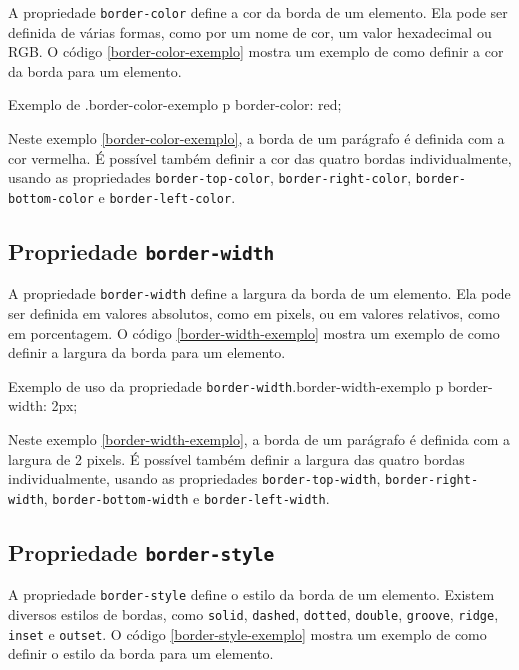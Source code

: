 A propriedade \texttt{border-color} define a cor da borda de um elemento. Ela pode ser definida de várias formas, como por um nome de cor, um valor hexadecimal ou RGB. O código \ref{border-color-exemplo} mostra um exemplo de como definir a cor da borda para um elemento.

\begin{csscode}{Exemplo de .}{border-color-exemplo}
p {
    border-color: red;
}
\end{csscode}

Neste exemplo \ref{border-color-exemplo}, a borda de um parágrafo é definida com a cor vermelha. É possível também definir a cor das quatro bordas individualmente, usando as propriedades \texttt{border-top-color}, \texttt{border-right-color}, \texttt{border-bottom-color} e \texttt{border-left-color}.

\subsection{Propriedade \texttt{border-width}}

A propriedade \texttt{border-width} define a largura da borda de um elemento. Ela pode ser definida em valores absolutos, como em pixels, ou em valores relativos, como em porcentagem. O código \ref{border-width-exemplo} mostra um exemplo de como definir a largura da borda para um elemento.

\begin{csscode}{Exemplo de uso da propriedade \texttt{border-width}.}{border-width-exemplo}
p {
    border-width: 2px;
}
\end{csscode}

Neste exemplo \ref{border-width-exemplo}, a borda de um parágrafo é definida com a largura de 2 pixels. É possível também definir a largura das quatro bordas individualmente, usando as propriedades \texttt{border-top-width}, \texttt{border-right-width}, \texttt{border-bottom-width} e \texttt{border-left-width}.

\subsection{Propriedade \texttt{border-style}}

A propriedade \texttt{border-style} define o estilo da borda de um elemento. Existem diversos estilos de bordas, como \texttt{solid}, \texttt{dashed}, \texttt{dotted}, \texttt{double}, \texttt{groove}, \texttt{ridge}, \texttt{inset} e \texttt{outset}. O código \ref{border-style-exemplo} mostra um exemplo de como definir o estilo da borda para um elemento.

